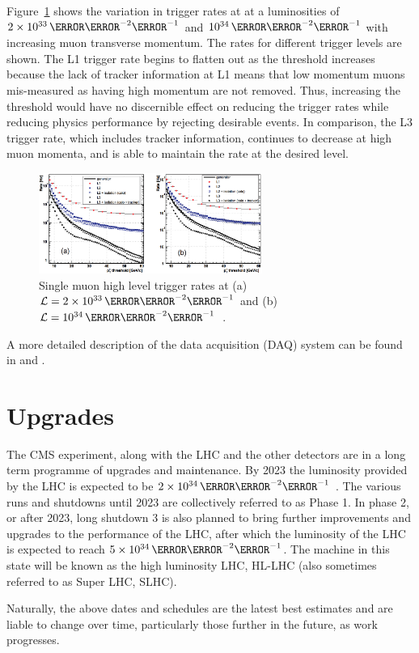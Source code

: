 Figure~\ref{fig:single_muon_trigger_rates} shows the variation in trigger rates at at a luminosities of
$2\times10^{33}\cm^{-2}\s^{-1}$ and $10^{34}\cm^{-2}\s^{-1}$ with increasing muon transverse momentum. The
rates for different trigger levels are shown. The L1 trigger rate begins to flatten out as the \pt threshold
increases because the lack of tracker information at L1 means that low momentum muons mis-measured as having
high momentum are not removed. Thus, increasing the threshold would have no discernible effect on reducing the
trigger rates while reducing physics performance by rejecting desirable events. In comparison, the L3 trigger
rate, which includes tracker information, continues to decrease at high muon momenta, and is able to maintain
the rate at the desired level.

\begin{figure}[hbtp]
   \centering
     \includegraphics[width=0.65\textwidth]{Chapters/02_Detector/Images/Muon_trigger_rates.png}\hfill
     \caption[Single muon HLT rates at low and high luminosities.]{Single
     muon high level trigger rates at (a) $\mathcal{L}=2\times10^{33}\cm^{-2}\s^{-1}$ and (b)
     $\mathcal{L}=10^{34}\cm^{-2}\s^{-1}$~\cite{Cittolin:578006}.}
     \label{fig:single_muon_trigger_rates}
\end{figure}

A more detailed description of the data acquisition (DAQ) system can be found in \cite{CMS_experiment}
and \cite{CMS_TDR1}.

\section{Upgrades}
\label{s:Upgrades}
The CMS experiment, along with the LHC and the other detectors are in a long term programme of upgrades and
maintenance. By 2023 the luminosity provided by the LHC is expected to be $2\times10^{34}\cm^{-2}\s^{-1}$
\cite{Technical_Proposal_Upgrade_of_CMS_Detector_through_2020}. The various runs and shutdowns until 2023 are
collectively referred to as Phase 1. In phase 2, or after 2023, long shutdown 3 is also planned to bring
further improvements and upgrades to the performance of the LHC, after which the luminosity of the LHC is
expected to reach $5\times10^{34}\cm^{-2}\s^{-1}$. The machine in this state will be known as the high
luminosity LHC, HL-LHC (also sometimes referred to as Super LHC, SLHC).

Naturally, the above dates and schedules are the latest best estimates and are liable to change over time,
particularly those further in the future, as work progresses.